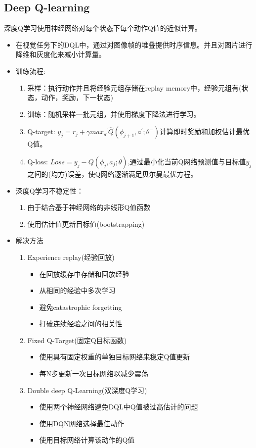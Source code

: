 \documentclass[UTF8]{ctexart}
\begin{document}
\subsection{Deep Q-learning}
深度Q学习使用神经网络对每个状态下每个动作Q值的近似计算。

\begin{itemize}
    \item 在视觉任务下的DQL中，通过对图像帧的堆叠提供时序信息。并且对图片进行降维和灰度化来减小计算量。
    \item 训练流程:
    \begin{enumerate}
        \item 采样：执行动作并且将经验元组存储在replay memory中，经验元组有(状态，动作，奖励，下一状态)
        \item 训练：随机采样一批元组，并使用梯度下降法进行学习。
        \item Q-target: $y_{j}=r_{j}+\gamma max_{a^{'}}\hat{Q}(\phi_{j+1} ,a^{'};\theta^{-}) $计算即时奖励和加权估计最优Q值。
        \item Q-loss: $Loss=y_{j}-Q(\phi_{j},a_{j};\theta)$,通过最小化当前Q网络预测值与目标值$y_{j}$之间的(均方)误差，使Q网络逐渐满足贝尔曼最优方程。
    \end{enumerate}
    \item 深度Q学习不稳定性：
    \begin{enumerate}
        \item 由于结合基于神经网络的非线形Q值函数
        \item 使用估计值更新目标值(bootstrapping)
    \end{enumerate}
    \item 解决方法
    \begin{enumerate}
        \item Experience replay(经验回放)
        \begin{itemize}
            \item 在回放缓存中存储和回放经验
            \item 从相同的经验中多次学习
            \item 避免catastrophic forgetting
            \item 打破连续经验之间的相关性
        \end{itemize}
        \item Fixed Q-Target(固定Q目标函数)
        
        \begin{itemize}
            \item 使用具有固定权重的单独目标网络来稳定Q值更新
            \item 每N步更新一次目标网络以减少震荡
        \end{itemize}
        \item Double deep Q-Learning(双深度Q学习)
        
        \begin{itemize}
            \item 使用两个神经网络避免DQL中Q值被过高估计的问题
            \item 使用DQN网络选择最佳动作
            \item 使用目标网络计算该动作的Q值
        \end{itemize}
    \end{enumerate}
\end{itemize}
\end{document}
